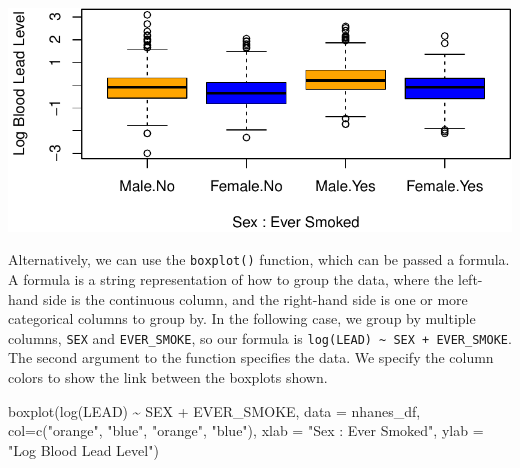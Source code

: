 \documentclass[
  letterpaper,
]{latex/krantz}
\makeatletter
\newenvironment{Shaded}{\begin{snugshade}}{\end{snugshade}}
\newcommand{\AttributeTok}[1]{\textcolor[rgb]{0.40,0.45,0.13}{#1}}
\newcommand{\FunctionTok}[1]{\textcolor[rgb]{0.28,0.35,0.67}{#1}}
\newcommand{\NormalTok}[1]{\textcolor[rgb]{0.00,0.23,0.31}{#1}}
\newcommand{\SpecialCharTok}[1]{\textcolor[rgb]{0.37,0.37,0.37}{#1}}
\newcommand{\StringTok}[1]{\textcolor[rgb]{0.13,0.47,0.30}{#1}}
\newenvironment{kframe}{%
\medskip{}
\setlength{\fboxsep}{.8em}
 \def\at@end@of@kframe{}%
 \ifinner\ifhmode%
  \def\at@end@of@kframe{\end{minipage}}%
  \begin{minipage}{\columnwidth}%
 \fi\fi%
 \def\FrameCommand##1{\hskip\@totalleftmargin \hskip-\fboxsep
 \colorbox{shadecolor}{##1}\hskip-\fboxsep
     \hskip-\linewidth \hskip-\@totalleftmargin \hskip\columnwidth}%
 \MakeFramed {\advance\hsize-\width
   \@totalleftmargin\z@ \linewidth\hsize
   \@setminipage}}%
 {\par\unskip\endMakeFramed%
 \at@end@of@kframe}
\renewenvironment{Shaded}{\begin{kframe}}{\end{kframe}}
\makeatother
\begin{document}
\begin{Shaded}
\end{Shaded}

\begin{center}
\includegraphics[width=1\textwidth,height=\textheight]{book/exploratory_analysis_files/figure-pdf/unnamed-chunk-16-1.pdf}
\end{center}

Alternatively, we can use the
\texttt{boxplot()}
function, which can be passed a formula. A formula is a string
representation of how to group the data, where the left-hand side is the
continuous column, and the right-hand side is one or more categorical
columns to group by. In the following case, we group by multiple
columns, \texttt{SEX} and \texttt{EVER\_SMOKE}, so our formula is
\texttt{log(LEAD)\ \textasciitilde{}\ SEX\ +\ EVER\_SMOKE}. The second
argument to the function specifies the data. We specify the column
colors to show the link between the boxplots shown.

\begin{Shaded}
\begin{Highlighting}[]
\FunctionTok{boxplot}\NormalTok{(}\FunctionTok{log}\NormalTok{(LEAD) }\SpecialCharTok{\textasciitilde{}}\NormalTok{ SEX }\SpecialCharTok{+}\NormalTok{ EVER\_SMOKE, }\AttributeTok{data =}\NormalTok{ nhanes\_df, }
        \AttributeTok{col=}\FunctionTok{c}\NormalTok{(}\StringTok{"orange"}\NormalTok{, }\StringTok{"blue"}\NormalTok{, }\StringTok{"orange"}\NormalTok{, }\StringTok{"blue"}\NormalTok{),}
        \AttributeTok{xlab =} \StringTok{"Sex : Ever Smoked"}\NormalTok{, }\AttributeTok{ylab =} \StringTok{"Log Blood Lead Level"}\NormalTok{)}
\end{Highlighting}
\end{Shaded}
\end{document}
